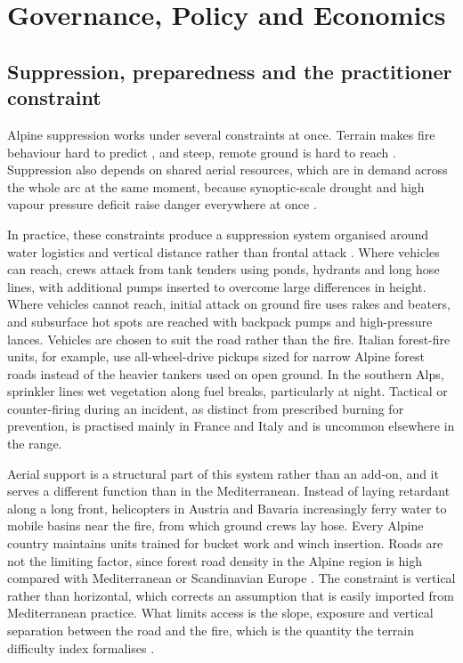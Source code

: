 \documentclass[11pt,a4paper]{article}
\begin{document}
\section{Governance, Policy and Economics}
\label{sec:governance}

\subsection{Suppression, preparedness and the practitioner constraint}

Alpine suppression works under several constraints at once. Terrain makes fire behaviour hard to predict \citep{sharples_overview_2009, melzner_brief_2019}, and steep, remote ground is hard to reach \citep{muller_forest_2020}. Suppression also depends on shared aerial resources, which are in demand across the whole arc at the same moment, because synoptic-scale drought and high vapour pressure deficit raise danger everywhere at once \citep{miller_compounding_2025}.

In practice, these constraints produce a suppression system organised around water logistics and vertical distance rather than frontal attack \citep{muller_forest_2020}. Where vehicles can reach, crews attack from tank tenders using ponds, hydrants and long hose lines, with additional pumps inserted to overcome large differences in height. Where vehicles cannot reach, initial attack on ground fire uses rakes and beaters, and subsurface hot spots are reached with backpack pumps and high-pressure lances. Vehicles are chosen to suit the road rather than the fire. Italian forest-fire units, for example, use all-wheel-drive pickups sized for narrow Alpine forest roads instead of the heavier tankers used on open ground. In the southern Alps, sprinkler lines wet vegetation along fuel breaks, particularly at night. Tactical or counter-firing during an incident, as distinct from prescribed burning for prevention, is practised mainly in France and Italy and is uncommon elsewhere in the range.

Aerial support is a structural part of this system rather than an add-on, and it serves a different function than in the Mediterranean. Instead of laying retardant along a long front, helicopters in Austria and Bavaria increasingly ferry water to mobile basins near the fire, from which ground crews lay hose. Every Alpine country maintains units trained for bucket work and winch insertion. Roads are not the limiting factor, since forest road density in the Alpine region is high compared with Mediterranean or Scandinavian Europe \citep{muller_forest_2020}. The constraint is vertical rather than horizontal, which corrects an assumption that is easily imported from Mediterranean practice. What limits access is the slope, exposure and vertical separation between the road and the fire, which is the quantity the terrain difficulty index formalises \citep{cardil_assessing_2025}.
\end{document}
